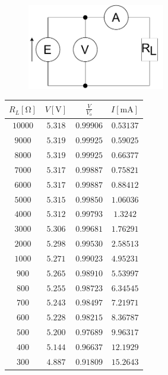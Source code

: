 \begin{figure}[H]
	\centering
	\includegraphics[width=6cm]{schematics/2.pdf}
	\caption{}
\end{figure}

\begin{table}[H]
	\begin{subtable}[c]{0.5\textwidth}
		\centering
			\begin{tabular}{ c | c | c | c}
			$R_L [\unit{\ohm}]$ & $V [\unit{\volt}]$ & $\frac{V}{V_o}$ & $I [\unit{\milli\ampere}]$ \\
			\hline
			$10000$ & $5.318$ & $0.99906$ & $0.53137$ \\
			$9000$ & $5.319$ & $0.99925$ & $0.59025$ \\
			$8000$ & $5.319$ & $0.99925$ & $0.66377$ \\
			$7000$ & $5.317$ & $0.99887$ & $0.75821$ \\
			$6000$ & $5.317$ & $0.99887$ & $0.88412$ \\
			$5000$ & $5.315$ & $0.99850$ & $1.06036$ \\
			$4000$ & $5.312$ & $0.99793$ & $1.3242$ \\
			$3000$ & $5.306$ & $0.99681$ & $1.76291$ \\
			$2000$ & $5.298$ & $0.99530$ & $2.58513$ \\
			$1000$ & $5.271$ & $0.99023$ & $4.95231$ \\
			$900$ & $5.265$ & $0.98910$ & $5.53997$ \\
			$800$ & $5.255$ & $0.98723$ & $6.34545$ \\
			$700$ & $5.243$ & $0.98497$ & $7.21971$ \\
			$600$ & $5.228$ & $0.98215$ & $8.36787$ \\
			$500$ & $5.200$ & $0.97689$ & $9.96317$ \\
			$400$ & $5.144$ & $0.96637$ & $12.1929$ \\
			$300$ & $4.887$ & $0.91809$ & $15.2643$ \\
		\end{tabular}
	\end{subtable}

\end{table}

